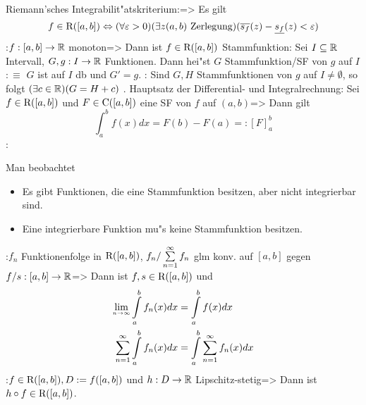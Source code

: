 \theorem Riemann'sches Integrabilit"atskriterium:=>{
  Es gilt
  \[f\in{\rm R}([a,b])\Leftrightarrow(\forall \varepsilon>0)(\exists z(a,b) \text{ Zerlegung})
    (\overline{s_f}(z)-\underline{s_f}(z)<\varepsilon)
    \]
  }
\theorem:$f:[a,b]\to\mathbb R$ monoton=>{
  Dann ist $f\in{\rm R}([a,b])$
  }
 Stammfunktion:{
  Sei $I\subseteq\mathbb R$ Intervall, $G,g:I\to\mathbb R$ Funktionen.
  Dann hei"st $G$ Stammfunktion/SF von $g$ auf $I$ $:\equiv$
  $G$ ist auf $I$ db und $G'=g$.
  }
\remark:{
  Sind $G,H$ Stammfunktionen von $g$ auf $I\ne\emptyset$, so folgt
  $(\exists c\in\mathbb R)(G=H+c)$
  }
. Hauptsatz der Differential- und Integralrechnung:
  Sei $f\in{\rm R}([a,b])$ und $F\in{\rm C}([a,b])$ eine SF von $f$ auf
  $(a,b)$=>{
  Dann gilt
  \[\int_a^b f(x)dx=F(b)-F(a)=:[F]_a^b
    \]
  }
\remark:{
  Man beobachtet
  \begin{itemize}
    \item Es gibt Funktionen, die eine Stammfunktion besitzen, aber nicht 
      integrierbar sind.
    \item Eine integrierbare Funktion mu"s keine Stammfunktion besitzen.
    \end{itemize}
  }    
\theorem:$f_n$ Funktionenfolge in ${\rm R}([a,b])$, 
  $f_n/\sumn 1 f_n$ glm konv. auf $[a,b]$ gegen $f/s:[a,b]\to\mathbb R$=>{
  Dann ist $f,s\in{\rm R}([a,b])$ und 
  \begin{align*}
    \limn \int_a^b f_n(x)dx &= \int_a^b f(x) dx\\
    \sumn 1 \int_a^b f_n(x)dx &= \int_a^b \sumn 1 f_n(x) dx\\
    \end{align*}
  }
\theorem:$f\in{\rm R}([a,b]), D:=f([a,b])$ und $h: D\to\mathbb R$
  Lipschitz-stetig=>{
  Dann ist $h\circ f\in{\rm R}([a,b])$.
  }
